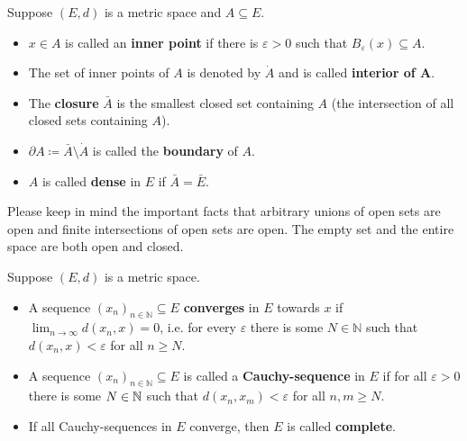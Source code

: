 \begin{ldef}
\begin{deff}
	Suppose $(E,d)$ is a metric space and $A \subseteq E$. 
	\begin{itemize}
		\item
			$x\in A$ is called an \textbf{inner point} if there is $\varepsilon>0$ such that $B_\varepsilon(x)\subseteq A$.
		\item
			The set of inner points of $A$ is denoted by $\dot{A}$ and is called \textbf{interior of A}.
		\item
			The \textbf{closure} $\bar{A}$ is the smallest closed set containing $A$ (the intersection of all closed sets containing $A$).
		\item
			$\partial A \coloneqq \bar{A}\text{\textbackslash}\dot{A}$ is called the \textbf{boundary} of $A$.
		\item
			$A$ is called \textbf{dense} in $E$ if $\bar{A} = \bar{E}$.
	\end{itemize}
\end{deff}
\end{ldef}
Please keep in mind the important facts that arbitrary unions of open sets are open and finite intersections of open sets are open. The empty set and the entire space are both open and closed.
\begin{ldef}
\begin{deff}
Suppose $(E,d)$ is a metric space.
\begin{itemize}
	\item	A sequence $(x_n)_{n\in\mathbb{N}} \subseteq E$ \textbf{converges} in $E$ towards $x$ if $\lim_{n\to\infty} d(x_n,x)=0$, i.e. for every $\varepsilon$ there is some $N\in\mathbb{N}$ such that $d(x_n,x)<\varepsilon$ for all $n \geq N$.
	\item	A sequence $(x_n)_{n\in\mathbb{N}} \subseteq E$ is called a \textbf{Cauchy-sequence} in $E$ if for all $\varepsilon>0$ there is some $N\in \mathbb{N}$ such that $d(x_n,x_m)<\varepsilon$ for all $n,m\geq N$. 
	\item If all Cauchy-sequences in $E$ converge, then $E$ is called \textbf{complete}.
\end{itemize}
\end{deff}
\end{ldef}


